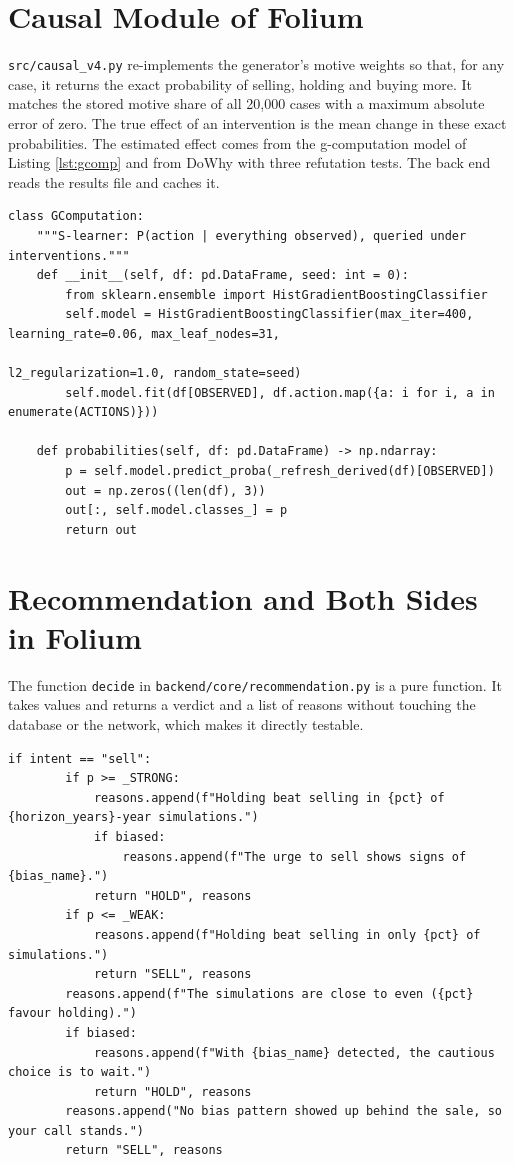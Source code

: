\section{Causal Module of Folium}
\texttt{src/causal\_v4.py} re-implements the generator's motive weights so that, for any case, it returns the exact probability of selling, holding and buying more. It matches the stored motive share of all 20,000 cases with a maximum absolute error of zero. The true effect of an intervention is the mean change in these exact probabilities. The estimated effect comes from the g-computation model of Listing \ref{lst:gcomp} and from DoWhy with three refutation tests. The back end reads the results file and caches it.

\begin{lstlisting}[caption={G-computation estimator (\texttt{src/causal\_v4.py})}, label=lst:gcomp]
class GComputation:
    """S-learner: P(action | everything observed), queried under interventions."""
    def __init__(self, df: pd.DataFrame, seed: int = 0):
        from sklearn.ensemble import HistGradientBoostingClassifier
        self.model = HistGradientBoostingClassifier(max_iter=400, learning_rate=0.06, max_leaf_nodes=31,
                                                    l2_regularization=1.0, random_state=seed)
        self.model.fit(df[OBSERVED], df.action.map({a: i for i, a in enumerate(ACTIONS)}))

    def probabilities(self, df: pd.DataFrame) -> np.ndarray:
        p = self.model.predict_proba(_refresh_derived(df)[OBSERVED])
        out = np.zeros((len(df), 3))
        out[:, self.model.classes_] = p
        return out
\end{lstlisting}

\section{Recommendation and Both Sides in Folium}
The function \texttt{decide} in \texttt{backend/core/recommendation.py} is a pure function. It takes values and returns a verdict and a list of reasons without touching the database or the network, which makes it directly testable.

\begin{lstlisting}[caption={Evidence rules for the sell intent (excerpt of \texttt{decide})}, label=lst:decide]
    if intent == "sell":
        if p >= _STRONG:
            reasons.append(f"Holding beat selling in {pct} of {horizon_years}-year simulations.")
            if biased:
                reasons.append(f"The urge to sell shows signs of {bias_name}.")
            return "HOLD", reasons
        if p <= _WEAK:
            reasons.append(f"Holding beat selling in only {pct} of simulations.")
            return "SELL", reasons
        reasons.append(f"The simulations are close to even ({pct} favour holding).")
        if biased:
            reasons.append(f"With {bias_name} detected, the cautious choice is to wait.")
            return "HOLD", reasons
        reasons.append("No bias pattern showed up behind the sale, so your call stands.")
        return "SELL", reasons
\end{lstlisting}

